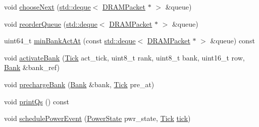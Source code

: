 \begin{DoxyCompactItemize}
void \hyperlink{classDRAMCtrl_a45c15f5a90be2e23d6bde9f706db7f24}{chooseNext} (\hyperlink{classstd_1_1deque}{std::deque}$<$ \hyperlink{classDRAMCtrl_1_1DRAMPacket}{DRAMPacket} $\ast$ $>$ \&queue)
\item 
void \hyperlink{classDRAMCtrl_aabfe6aa48e67d5b5c21e77dfa8a7e965}{reorderQueue} (\hyperlink{classstd_1_1deque}{std::deque}$<$ \hyperlink{classDRAMCtrl_1_1DRAMPacket}{DRAMPacket} $\ast$ $>$ \&queue)
\item 
uint64\_\-t \hyperlink{classDRAMCtrl_a29301d0e29279a6e233f15c13959b0de}{minBankActAt} (const \hyperlink{classstd_1_1deque}{std::deque}$<$ \hyperlink{classDRAMCtrl_1_1DRAMPacket}{DRAMPacket} $\ast$ $>$ \&queue) const 
\item 
void \hyperlink{classDRAMCtrl_a98181e99df633f767f5116fe80e92042}{activateBank} (\hyperlink{base_2types_8hh_a5c8ed81b7d238c9083e1037ba6d61643}{Tick} act\_\-tick, uint8\_\-t rank, uint8\_\-t bank, uint16\_\-t row, \hyperlink{classDRAMCtrl_1_1Bank}{Bank} \&bank\_\-ref)
\item 
void \hyperlink{classDRAMCtrl_ae75715461eec20eff07a532c11c3d54c}{prechargeBank} (\hyperlink{classDRAMCtrl_1_1Bank}{Bank} \&bank, \hyperlink{base_2types_8hh_a5c8ed81b7d238c9083e1037ba6d61643}{Tick} pre\_\-at)
\item 
void \hyperlink{classDRAMCtrl_a3c5f01de2fe3a6826581f3641cac2ba7}{printQs} () const 
\item 
void \hyperlink{classDRAMCtrl_a233880f1f4b8f6455a2ff083dda871d3}{schedulePowerEvent} (\hyperlink{classDRAMCtrl_aa59b8ef6374ae587f3c228eba57bdf80}{PowerState} pwr\_\-state, \hyperlink{base_2types_8hh_a5c8ed81b7d238c9083e1037ba6d61643}{Tick} \hyperlink{classClockedObject_a4daae57fbf09ee5423d123f5ce330e92}{tick})
\end{DoxyCompactItemize}

